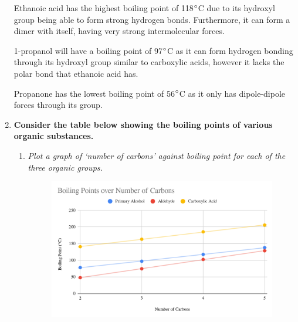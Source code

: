 \documentclass{report}
\begin{document}
\begin{enumerate}
			\begin{center}
			\end{center}
			\begin{center}
			\end{center}
			\begin{center}
			\end{center}

			Ethanoic acid has the highest boiling point of 118$\degree$C due to its hydroxyl group being able to form strong hydrogen bonds. Furthermore, it can form a dimer with itself, having very strong intermolecular forces.

			1-propanol will have a boiling point of 97$\degree$C as it can form hydrogen bonding through its hydroxyl group similar to carboxylic acids, however it lacks the polar  bond that ethanoic acid has.

			Propanone has the lowest boiling point of 56$\degree$C as it only has dipole-dipole forces through its  group.

		\item \textbf{Consider the table below showing the boiling points of various organic substances.}

			\begin{enumerate}
				\item \textit{Plot a graph of ‘number of carbons’ against boiling point for each of the three organic groups.}

					\begin{figure}[H]
						\centering
						\includegraphics[width=15cm]{chapter_9_review_graph.png}
					\end{figure}


\end{enumerate}
\end{enumerate}
\end{document}
